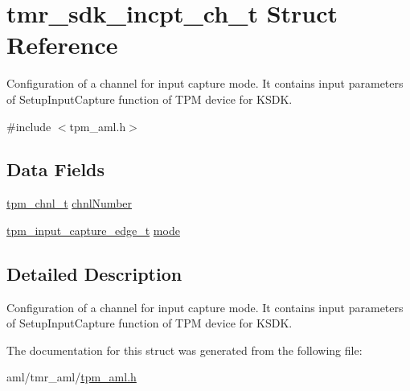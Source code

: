 \hypertarget{structtmr__sdk__incpt__ch__t}{}\section{tmr\+\_\+sdk\+\_\+incpt\+\_\+ch\+\_\+t Struct Reference}
\label{structtmr__sdk__incpt__ch__t}


Configuration of a channel for input capture mode. It contains input parameters of Setup\+Input\+Capture function of T\+PM device for K\+S\+DK.  




{\ttfamily \#include $<$tpm\+\_\+aml.\+h$>$}

\subsection*{Data Fields}
\begin{DoxyCompactItemize}
\item 
\mbox{\hyperlink{group__tpm_gacda6962369e014c8ac72d1b58b224deb}{tpm\+\_\+chnl\+\_\+t}} \mbox{\hyperlink{group__struct__group_gaddc94dba6576d0b40cd83b493968a2e4}{chnl\+Number}}
\item 
\mbox{\hyperlink{group__tpm_ga5bcbd71358fe69e564786631827f7db1}{tpm\+\_\+input\+\_\+capture\+\_\+edge\+\_\+t}} \mbox{\hyperlink{group__struct__group_ga72eaddb2461dc4c31bdd3febd201b9aa}{mode}}
\end{DoxyCompactItemize}


\subsection{Detailed Description}
Configuration of a channel for input capture mode. It contains input parameters of Setup\+Input\+Capture function of T\+PM device for K\+S\+DK. 

The documentation for this struct was generated from the following file\+:\begin{DoxyCompactItemize}
\item 
aml/tmr\+\_\+aml/\mbox{\hyperlink{tpm__aml_8h}{tpm\+\_\+aml.\+h}}\end{DoxyCompactItemize}
